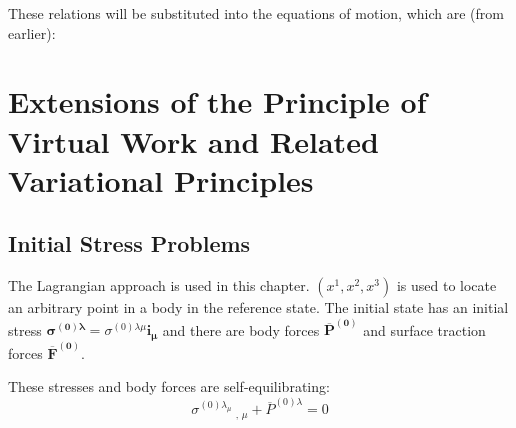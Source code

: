 \documentclass[11pt,letterpaper,titlepage,draft]{article}
\numberwithin{equation}{subsection}
\begin{document}
These relations will be substituted into the equations of motion, which are (from earlier):



\newpage
\section{Extensions of the Principle of Virtual Work and Related Variational Principles}
\subsection{Initial Stress Problems}
The Lagrangian approach is used in this chapter.
$ (x^1, x^2,x^3) $ is used to locate an arbitrary point in a body in the reference state.
The initial state has an initial stress $\mathbf{\sigma^{(0)\lambda}} = \sigma^{(0)\lambda \mu}\mathbf{i_{\mu}}$
and there are body forces $\mathbf{\overline{P}^{(0)}}$ and surface traction forces $\mathbf{\overline{F}^{(0)}}$.

These stresses and body forces are self-equilibrating:
$$
 \sigma^{(0)\lambda_{\mu}}\:_{,\,\mu} + \overline{P}^{(0)\lambda} = 0
$$


\newpage



\printindex
\end{document}
